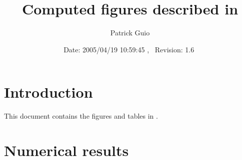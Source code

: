 \documentclass[10pt,a4paper,twocolumn]{article}
\title{Computed figures described in \\ \cite{shen:1987}}
\author{Patrick Guio}
\date{\normalsize$ $Date: 2005/04/19 10:59:45 $ $,~ $ $Revision: 1.6 $ $}
\begin{document}
\maketitle

\tableofcontents

\section{Introduction}

This document contains the figures and tables in \cite{shen:1987}.

\section{Numerical results}

\setcounter{figure}{1}
\begin{figure}[ht]
\centerline{\setlength{\epsfxsize}{.95\columnwidth}}
\caption{}
\end{figure}

\setcounter{figure}{3}
\begin{figure}[ht]
\centerline{\setlength{\epsfxsize}{.95\columnwidth}}
\caption{}
\end{figure}

\begin{figure}[ht]
\centerline{\setlength{\epsfxsize}{.85\columnwidth}}
\caption{\protect}
\end{figure}

\begin{figure}[ht]
\centerline{\setlength{\epsfxsize}{.95\columnwidth}}
\caption{}
\end{figure}

\setcounter{figure}{7}
\begin{figure}[ht]
\centerline{\setlength{\epsfxsize}{.95\columnwidth}}
\caption{}
\end{figure}

\begin{figure}[ht]
\centerline{\setlength{\epsfxsize}{.85\columnwidth}}
\caption{\protect}
\end{figure}

\begin{figure}[ht]
\centerline{\setlength{\epsfxsize}{.95\columnwidth}}
\caption{}
\end{figure}

\setcounter{figure}{11}
\begin{figure}[ht]
\centerline{\setlength{\epsfxsize}{.95\columnwidth}}
\caption{}
\end{figure}

\begin{figure}[ht]
\centerline{\setlength{\epsfxsize}{.85\columnwidth}}
\caption{\protect}
\end{figure}


\end{document}
